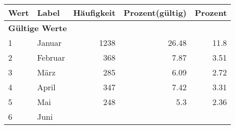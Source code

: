      \begin{longtable}{lXrrr}
     \toprule
     \textbf{Wert} & \textbf{Label} & \textbf{Häufigkeit} & \textbf{Prozent(gültig)} & \textbf{Prozent} \\
     \endhead
     \midrule
     \multicolumn{5}{l}{\textbf{Gültige Werte}}\\

     1 &
     \multicolumn{1}{X}{ Januar   } &


       \num{1238} &
       \num[round-mode=places,round-precision=2]{26,48} &
         \num[round-mode=places,round-precision=2]{11,8} \\

     2 &
     \multicolumn{1}{X}{ Februar   } &


       \num{368} &
       \num[round-mode=places,round-precision=2]{7,87} &
         \num[round-mode=places,round-precision=2]{3,51} \\

     3 &
     \multicolumn{1}{X}{ März   } &


       \num{285} &
       \num[round-mode=places,round-precision=2]{6,09} &
         \num[round-mode=places,round-precision=2]{2,72} \\

     4 &
     \multicolumn{1}{X}{ April   } &


       \num{347} &
       \num[round-mode=places,round-precision=2]{7,42} &
         \num[round-mode=places,round-precision=2]{3,31} \\

     5 &
     \multicolumn{1}{X}{ Mai   } &


       \num{248} &
       \num[round-mode=places,round-precision=2]{5,3} &
         \num[round-mode=places,round-precision=2]{2,36} \\

     6 &
     \multicolumn{1}{X}{ Juni   } &



\end{longtable}

